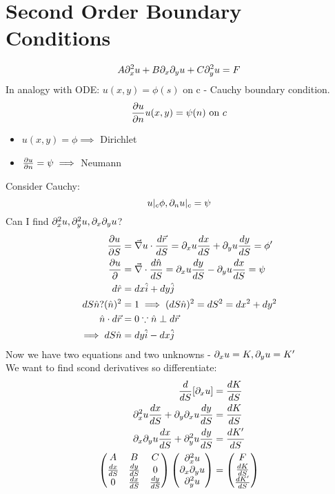 \documentclass[Maths.tex]{subfiles}
\begin{document}
\section{Second Order Boundary Conditions}
\begin{equation}
A\partial_x^2u + B\partial_x\partial_yu + C\partial_y^2u = F
\end{equation}
In analogy with ODE: $u(x,y) = \phi(s)$ on c - Cauchy boundary condition.
\begin{equation}
	\frac{\partial u}{\partial n}u(x,y) = \psi(n) \text{ on }c
\end{equation}
\begin{itemize}
	\item $u(x,y) = \phi \implies$ Dirichlet
	\item $\frac{\partial u}{\partial n} = \psi \implies$ Neumann
\end{itemize}
Consider Cauchy:
\begin{equation}
	u|_c\phi, \partial_nu|_c = \psi
\end{equation}
Can I find $\partial_x^2u, \partial_y^2u, \partial_x\partial_yu$?
\begin{align}
	\frac{\partial u}{\partial S} &= \vec{\nabla}u\cdot\frac{d\vec{r}}{dS} = \partial_xu\frac{dx}{dS} + \partial_yu \frac{dy}{dS} = \phi' \\
	\frac{\partial u}{\partial } &= \vec{\nabla}\cdot\frac{d\hat{n}}{dS} = \partial_xu\frac{dy}{dS} - \partial_yu\frac{dx}{dS} = \psi \\
	d\hat{r} &= dx\hat{i} + dy\hat{j} \\
	dS\hat{n} ? (\hat{n})^2 &= 1 \implies (dS\hat{n})^2 = dS^2 = dx^2 + dy^2 \\
	\hat{n}\cdot d\vec{r} &= 0 \because \hat{n} \perp d\vec{r} \\
	\implies dS\hat{n} &= dy\hat{i} - dx\hat{j}
\end{align}
Now we have two equations and two unknowns - $\partial_xu = K, \partial_yu = K'$ \\
We want to find scond derivatives so differentiate:
\begin{align}
	\frac{d}{dS}[\partial_xu] &= \frac{dK}{dS} \\
	\partial_x^2u\frac{dx}{dS} + \partial_y\partial_xu\frac{dy}{dS} &= \frac{dK}{dS} \\
	\partial_x\partial_yu\frac{dx}{dS} + \partial_y^2u\frac{dy}{dS} &= \frac{dK'}{dS} \\
	\begin{pmatrix} A & B & C \\ \frac{dx}{dS} & \frac{dy}{dS} & 0 \\
		0 & \frac{dx}{dS} & \frac{dy}{dS} \end{pmatrix}\begin{pmatrix} \partial_x^2u \\ \partial_x\partial_yu \\ \partial_y^2u \end{pmatrix} &= \begin{pmatrix} F \\ \frac{dK}{dS} \\ \frac{dK'}{dS} \end{pmatrix}
\end{align}
\end{document}
